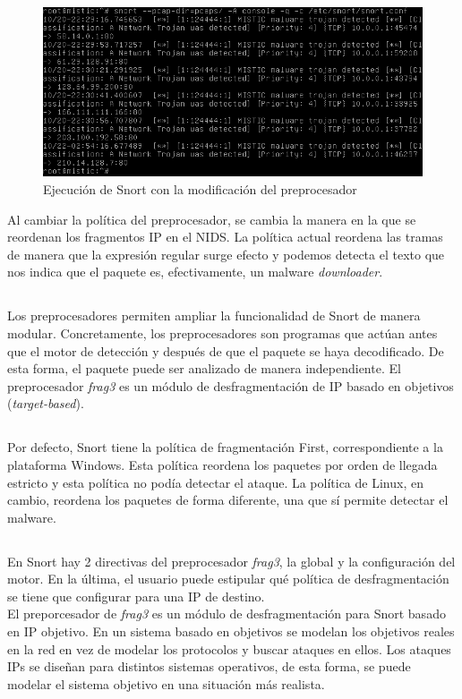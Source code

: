 \documentclass[10pt,a4paper]{article}
\begin{document}
\subsection{}
\begin{figure}[htpb]
  \centering
  \includegraphics[width=1\textwidth]{3_2.png}
  \caption{Ejecución de Snort con la modificación del preprocesador}
  \label{fig:snort2}
\end{figure}
Al cambiar la política del preprocesador, se cambia la manera en la que se reordenan los fragmentos IP en el NIDS. La política actual reordena las tramas de manera que la expresión regular surge efecto y podemos detecta el texto que nos indica que el paquete es, efectivamente, un malware \textit{downloader}.
\subsection{}
Los preprocesadores permiten ampliar la funcionalidad de Snort de manera modular. Concretamente, los preprocesadores son programas que actúan antes que el motor de detección y después de que el paquete se haya decodificado. De esta forma, el paquete puede ser analizado de manera independiente. El preprocesador \textit{frag3} es un módulo de desfragmentación de IP basado en objetivos (\textit{target-based}).
 
\subsection{}
Por defecto, Snort tiene la política de fragmentación First, correspondiente a la plataforma Windows. Esta política reordena los paquetes por orden de llegada estricto y esta política no podía detectar el ataque. La política de Linux, en cambio, reordena los paquetes de forma diferente, una que sí permite detectar el malware.
\subsection{}
En Snort hay 2 directivas del preprocesador \textit{frag3}, la global y la configuración del motor. En la última, el usuario puede estipular qué política de desfragmentación se tiene que configurar para una IP de destino. \\
El preporcesador de \textit{frag3} es un módulo de desfragmentación para Snort basado en IP objetivo. En un sistema basado en objetivos se modelan los objetivos reales en la red en vez de modelar los protocolos y buscar ataques en ellos. Los ataques IPs se diseñan para distintos sistemas operativos, de esta forma, se puede modelar el sistema objetivo en una situación más realista.
\end{document}

